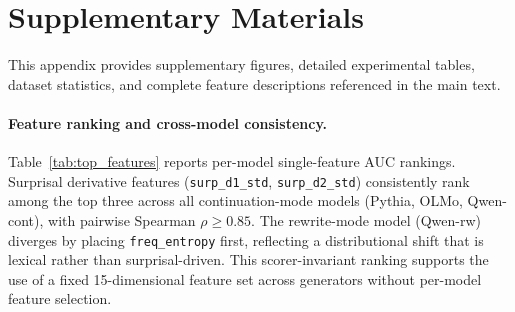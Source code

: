 \appendix
\setlength{\floatsep}{6pt plus 2pt minus 2pt}
\setlength{\textfloatsep}{8pt plus 2pt minus 2pt}
\setlength{\intextsep}{6pt plus 2pt minus 2pt}
\setlength{\abovecaptionskip}{4pt}
\setlength{\belowcaptionskip}{2pt}
\section{Supplementary Materials}
\label{sec:appendix}

This appendix provides supplementary figures, detailed experimental tables, dataset statistics, and complete feature descriptions referenced in the main text.

\paragraph{Feature ranking and cross-model consistency.}
Table~\ref{tab:top_features} reports per-model single-feature AUC rankings.
Surprisal derivative features (\texttt{surp\_d1\_std}, \texttt{surp\_d2\_std}) consistently rank among the top three across all continuation-mode models (Pythia, OLMo, Qwen-cont), with pairwise Spearman $\rho \geq 0.85$.
The rewrite-mode model (Qwen-rw) diverges by placing \texttt{freq\_entropy} first, reflecting a distributional shift that is lexical rather than surprisal-driven.
This scorer-invariant ranking supports the use of a fixed 15-dimensional feature set across generators without per-model feature selection.

\begin{table}[!htbp]
\centering
\small
\caption{Top-3 features by single-feature $\auc$ ranking. Bold: shared across all continuation-mode models. Spearman $\rho$ (continuation pairs): Pythia--OLMo 0.95, Pythia--Qwen-cont 0.91, OLMo--Qwen-cont 0.85.}
\label{tab:top_features}
\end{table}

